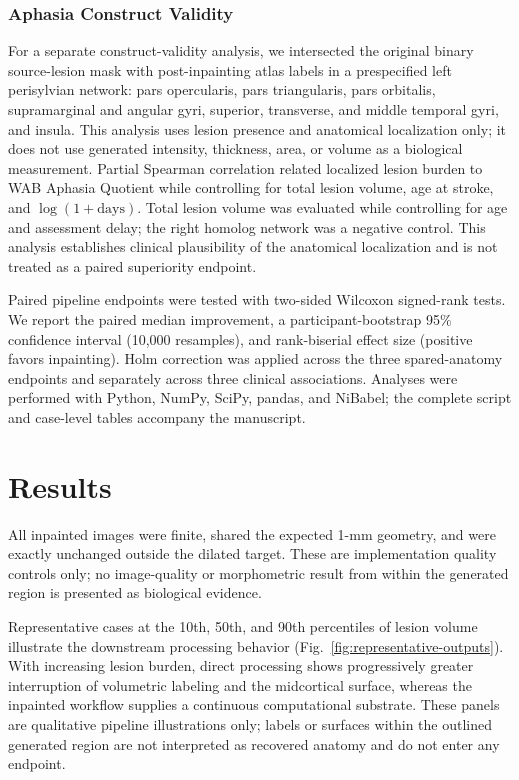 \documentclass[runningheads]{llncs}
\begin{document}
\subsubsection{Aphasia Construct Validity}
For a separate construct-validity analysis, we intersected the original binary source-lesion mask with post-inpainting atlas labels in a prespecified left perisylvian network: pars opercularis, pars triangularis, pars orbitalis, supramarginal and angular gyri, superior, transverse, and middle temporal gyri, and insula. This analysis uses lesion presence and anatomical localization only; it does not use generated intensity, thickness, area, or volume as a biological measurement. Partial Spearman correlation related localized lesion burden to WAB Aphasia Quotient while controlling for total lesion volume, age at stroke, and \(\log(1+\mathrm{days})\). Total lesion volume was evaluated while controlling for age and assessment delay; the right homolog network was a negative control. This analysis establishes clinical plausibility of the anatomical localization and is not treated as a paired superiority endpoint.

Paired pipeline endpoints were tested with two-sided Wilcoxon signed-rank tests. We report the paired median improvement, a participant-bootstrap 95\% confidence interval (10,000 resamples), and rank-biserial effect size (positive favors inpainting). Holm correction was applied across the three spared-anatomy endpoints and separately across three clinical associations. Analyses were performed with Python, NumPy, SciPy, pandas, and NiBabel; the complete script and case-level tables accompany the manuscript.

\section{Results}
All \ArcNAnalyzed{} inpainted images were finite, shared the expected 1-mm geometry, and were exactly unchanged outside the dilated target. These are implementation quality controls only; no image-quality or morphometric result from within the generated region is presented as biological evidence.

Representative cases at the 10th, 50th, and 90th percentiles of lesion volume illustrate the downstream processing behavior (Fig.~\ref{fig:representative-outputs}). With increasing lesion burden, direct processing shows progressively greater interruption of volumetric labeling and the midcortical surface, whereas the inpainted workflow supplies a continuous computational substrate. These panels are qualitative pipeline illustrations only; labels or surfaces within the outlined generated region are not interpreted as recovered anatomy and do not enter any endpoint.
\end{document}

